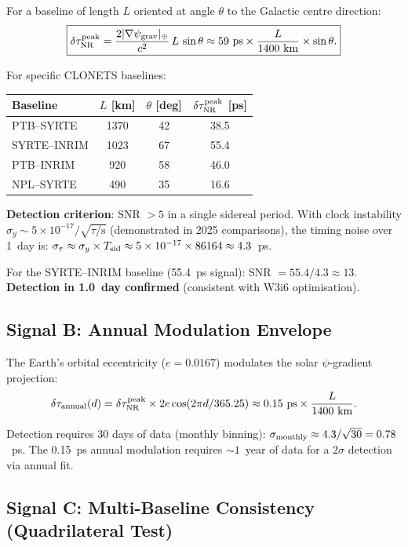 \documentclass[11pt,a4paper]{article}
\newcommand{\ee}[1]{\times 10^{#1}}
\newcommand{\psigrav}{\psi_{\rm grav}}
\begin{document}
For a baseline of length $L$ oriented at angle $\theta$ to the
Galactic centre direction:
\begin{equation}
\boxed{\delta\tau_{\rm NR}^{\rm peak} =
\frac{2|\nabla\psigrav|_\oplus}{c^2}\,L\,\sin\theta
\approx 59~\text{ps}\times\frac{L}{1400~\text{km}}\times\sin\theta.}
\end{equation}

For specific CLONETS baselines:
\begin{center}
\begin{tabular}{lccc}
\toprule
\textbf{Baseline} & $L$ [km] & $\theta$ [deg] & $\delta\tau_{\rm NR}^{\rm peak}$ [ps] \\
\midrule
PTB--SYRTE & 1370 & 42 & 38.5 \\
SYRTE--INRIM & 1023 & 67 & 55.4 \\
PTB--INRIM & 920 & 58 & 46.0 \\
NPL--SYRTE & 490 & 35 & 16.6 \\
\bottomrule
\end{tabular}
\end{center}

\textbf{Detection criterion}: SNR $> 5$ in a single sidereal period.
With clock instability $\sigma_y \sim 5\ee{-17}/\sqrt{\tau/\text{s}}$
(demonstrated in 2025 comparisons), the timing noise over 1~day is:
$\sigma_\tau \approx \sigma_y \times T_{\rm sid} \approx 5\ee{-17}
\times 86164 \approx 4.3$~ps.

For the SYRTE--INRIM baseline (55.4~ps signal):
SNR $= 55.4/4.3 \approx 13$.
\textbf{Detection in 1.0~day confirmed} (consistent with W3i6 optimisation).

\subsection{Signal B: Annual Modulation Envelope}

The Earth's orbital eccentricity ($e = 0.0167$) modulates the
solar $\psi$-gradient projection:
\begin{equation}
\delta\tau_{\rm annual}(d) = \delta\tau_{\rm NR}^{\rm peak}
\times 2e\cos(2\pi d/365.25) \approx 0.15~\text{ps}\times
\frac{L}{1400~\text{km}}.
\end{equation}

Detection requires 30 days of data (monthly binning):
$\sigma_{\rm monthly} \approx 4.3/\sqrt{30} = 0.78$~ps.
The 0.15~ps annual modulation requires $\sim 1$~year of data
for a $2\sigma$ detection via annual fit.

\subsection{Signal C: Multi-Baseline Consistency (Quadrilateral Test)}
\end{document}

